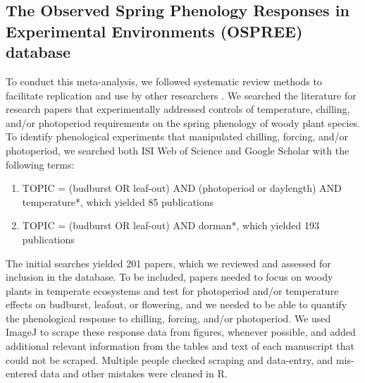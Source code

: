 \documentclass{article}
\begin{document}
\subsection*{The Observed Spring Phenology Responses in Experimental Environments (OSPREE) database}
\par To conduct this meta-analysis, we followed systematic review methods to facilitate replication and use by other researchers \emph{\citep[e.g., {\normalfont we include at least 22/27 items on the PRISMA checklist, as summarized in Appendix 1,}][]{moher2009}}. We searched the literature for research papers that experimentally addressed controls of temperature, chilling, and/or photoperiod requirements on the spring phenology of woody plant species. To identify phenological experiments that manipulated chilling, forcing, and/or photoperiod, we searched both ISI Web of Science and Google Scholar with the following terms: 
\begin{enumerate}
\item TOPIC = (budburst OR leaf-out) AND (photoperiod or daylength) AND temperature*, which yielded 85 publications

\item TOPIC = (budburst OR leaf-out) AND dorman*, which yielded 193 publications
\end{enumerate}



The initial searches yielded 201 papers, which we reviewed and assessed for inclusion in the database. To be included, papers needed to focus on woody plants in temperate ecosystems and test for photoperiod and/or temperature effects on budburst, leafout, or flowering, and we needed to be able to quantify the phenological response to chilling, forcing, and/or photoperiod. We used ImageJ to scrape these response data from figures, whenever possible, and added additional relevant information from the tables and text of each manuscript that could not be scraped. Multiple people checked scraping and data-entry, and mis-entered data and other mistakes were cleaned in R.
\end{document}
